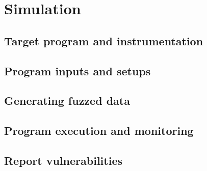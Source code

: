 \chapter{Simulation}


\section{Target program and instrumentation}
\section{Program inputs and setups}
\section{Generating fuzzed data}
\section{Program execution and monitoring}
\section{Report vulnerabilities}

